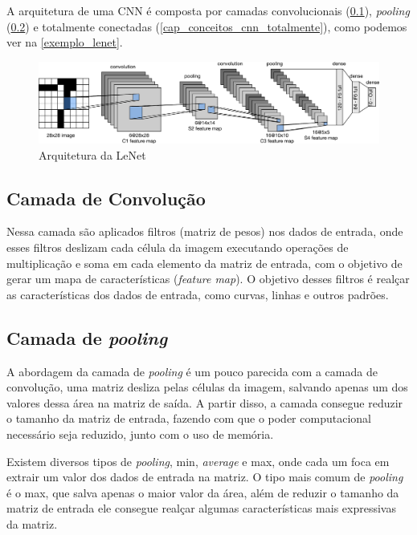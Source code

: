 A arquitetura de uma CNN é composta por camadas convolucionais (\ref{cap_conceitos_cnn_conv}),
\textit{pooling} (\ref{cap_conceitos_cnn_pooling}) e totalmente conectadas (\ref{cap_conceitos_cnn_totalmente}),
como podemos ver na \autoref{exemplo_lenet}.

\begin{figure}[htb]
	\caption {\label{exemplo_lenet} Arquitetura da LeNet}
	\begin{center}
		\includegraphics[scale=0.5]{Imagens/lenet}
	\end{center}
\end{figure}

\subsection{Camada de Convolução}\label{cap_conceitos_cnn_conv}
Nessa camada são aplicados filtros (matriz de pesos) nos dados de entrada,
onde esses filtros deslizam cada célula da imagem executando operações de multiplicação e soma
em cada elemento da matriz de entrada, com o objetivo de gerar um mapa de características (\textit{feature map}).
O objetivo desses filtros é realçar as características dos dados de entrada, como curvas, linhas e outros padrões.

\subsection{Camada de \textit{pooling}}\label{cap_conceitos_cnn_pooling}
A abordagem da camada de \textit{pooling} é um pouco parecida com a camada de convolução,
uma matriz desliza pelas células da imagem, salvando apenas um dos valores dessa área na matriz de saída.
A partir disso, a camada consegue reduzir o tamanho da matriz de entrada, fazendo com que o poder computacional
necessário seja reduzido, junto com o uso de memória.

Existem diversos tipos de \textit{pooling}, min, \textit{average} e max, onde cada um foca em extrair um valor dos
dados de entrada na matriz. O tipo mais comum de \textit{pooling} é o max, que salva apenas o maior valor da área,
além de reduzir o tamanho da matriz de entrada ele consegue realçar algumas características mais expressivas da matriz.

